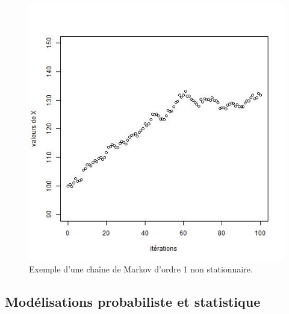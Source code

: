 
\begin{figure}[h!]
  \begin{center}
       \includegraphics[scale=0.7]{figures/concepts/MC-non-stationnaire.jpeg}
	\caption{
      \label{non-stat}
   Exemple d'une cha\^ine de Markov d'ordre 1 non stationnaire.}
  \end{center}
\end{figure}

\subsection{Mod\'elisations probabiliste et statistique}\label{confusion.modele}

